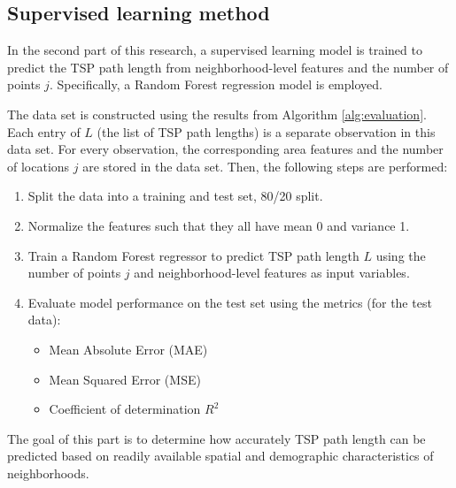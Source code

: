 \subsection{Supervised learning method}
In the second part of this research, a supervised learning model is trained to predict the TSP path length from neighborhood-level features and the number of
points \( j \). Specifically, a Random Forest regression model is employed.

The data set is constructed using the results from Algorithm \ref{alg:evaluation}. Each entry of $L$ (the list of TSP path lengths) is a separate observation
in this data set. For every observation, the corresponding area features and the number of locations $j$ are stored in the data set. Then, the following steps
are performed:
\begin{enumerate}
	\item Split the data into a training and test set, 80/20 split.
	\item Normalize the features such that they all have mean 0 and variance 1.
	\item Train a Random Forest regressor to predict TSP path length \( L \) using the number of points \( j \) and neighborhood-level features as input variables.
	\item Evaluate model performance on the test set using the metrics (for the test data):
	      \begin{itemize}
		      \item Mean Absolute Error (MAE)
		      \item Mean Squared Error (MSE)
		      \item Coefficient of determination \( R^2 \)
	      \end{itemize}
\end{enumerate}

The goal of this part is to determine how accurately TSP path length can be predicted based on readily available spatial and demographic characteristics of
neighborhoods.
